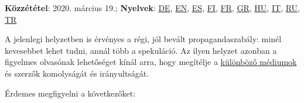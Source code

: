 \textbf{Közzététel}: 2020. március 19.; \textbf{Nyelvek}:
\href{https://swprs.org/corona-medien-propaganda/}{DE},
\href{https://swprs.org/corona-media-propaganda/}{EN},
\href{http://piensachile.com/2020/03/corona-medios-de-comunicacion-propaganda/}{ES},
\href{https://swprs.org/koronasta-mediasta-ja-propagandasta/}{FI},
\href{https://swprs.org/sur-le-coronavirus-les-medias-et-la-propagande/}{FR},
\href{https://swprs.org/corona-media-propaganda-greek/}{GR},
\href{https://swprs.org/korona-media-propaganda/}{HU},
\href{https://swprs.org/corona-media-propaganda-it/}{IT},
\href{https://swprs.org/\%d0\%be-\%d0\%ba\%d0\%be\%d1\%80\%d0\%be\%d0\%bd\%d0\%b0\%d0\%b2\%d0\%b8\%d1\%80\%d1\%83\%d1\%81\%d0\%b5-\%d1\%81\%d0\%bc\%d0\%b8-\%d0\%b8-\%d0\%bf\%d1\%80\%d0\%be\%d0\%bf\%d0\%b0\%d0\%b3\%d0\%b0\%d0\%bd\%d0\%b4\%d0\%b5/}{RU},
\href{https://swprs.org/korona-medya-ve-propaganda-uezerine/}{TR}

A jelenlegi helyzetben is érvényes a régi, jól bevált propagandaszabály:
minél kevesebbet lehet tudni, annál több a spekuláció. Az ilyen helyzet
azonban a figyelmes olvasónak lehetőséget kínál arra, hogy megítélje a
\href{https://swprs.org/medien-navigator/}{különböző médiumok} és
szerzők komolyságát és irányultságát.

Érdemes megfigyelni a következőket:

